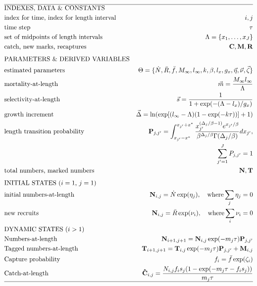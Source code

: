 \begin{table}
  \centering
\caption{Data, parameters, and analytical procedures for the length-based mark-recapture model.}\label{table:LSMRmodel} 
\tableEq
	\begin{small}
    \begin{align}
        \hline
		&\mbox{INDEXES, DATA \& CONSTANTS} \nonumber\\
		&\mbox{index for time, index for length interval} 
		&i,j \label{eq:T1.1}\\ 
		&\mbox{time step}  & \tau\\
		&\mbox{set of midpoints of length intervals}
		&\Lambda = \{x_1, \ldots,x_J\}\\
		&\mbox{catch, new marks, recaptures} 
		&\mathbf{C}, \mathbf{M}, \mathbf{R}\\[1ex]
		&\mbox{PARAMETERS \& DERIVED VARIABLES} \nonumber\\
		&\mbox{estimated parameters} 
		&\Theta=\{\dot{N},\bar{R},\bar{f},M_\infty,l_\infty,k,\beta,l_x,g_x,
			\vec{\eta},\vec{\nu},\vec{\zeta} \}\\
		&\mbox{mortality-at-length} 
		& \vec{m} = \frac{M_\infty l_\infty}{\Lambda}
		\label{eq:T1.6}\\
		&\mbox{selectivity-at-length} 
		& \vec{s} = \frac{1}{1+\exp(-(\Lambda-l_x)/g_x)}
		\label{eq:T1.7}\\
		&\mbox{growth increment} 
		& \vec{\Delta} = \ln( \exp[(l_\infty-\Lambda)(1-\exp(-k \tau))] +1)
		\label{eq:T1.8}\\
		&\mbox{length transition probability}
		& \mathbf{P}_{j,j'} =\int_{x_{j'}-x^*}^{x_{j'}+x^*} \frac{x_{j'}^{(\Delta_{j}/\beta-1)}
		e^{x_{j'}/\beta}}{\beta^{\Delta_{j}/\beta} \Gamma(\Delta_{j}/\beta)}dx_{j'}, \nonumber\\
		& &\quad \sum_{j'=1}^J P_{j,j'}= 1 
		\label{eq:T1.9}\\
		&\mbox{total numbers, marked numbers} 
		& \mathbf{N}, \mathbf{T}\\[1ex]
		&\mbox{INITIAL STATES ($i=1$, $j=1$)}  \nonumber\\
		&\mbox{initial numbers-at-length}
		&\mathbf{N}_{i,j} = \dot{N}\exp(\eta_j), \quad \mbox{where} \sum_j \eta_j=0
		\label{eq:T1.11}\\
		&\mbox{new recruits}
		&\mathbf{N}_{i,j} = \bar{R}\exp(\nu_i), \quad \mbox{where} \sum_i \nu_i=0
		\label{eq:T1.12}\\
		&\mbox{DYNAMIC STATES ($i>1$)} \nonumber\\
		&\mbox{Numbers-at-length}
		&\mathbf{N}_{i+1,j+1} = \mathbf{N}_{i,j} \exp(-m_j \tau) \mathbf{P}_{j,j'}\\
		&\mbox{Tagged numbers-at-length}
		&\mathbf{T}_{i+1,j+1} = \mathbf{T}_{i,j} \exp(-m_j \tau) \mathbf{P}_{j,j'} + \mathbf{M}_{i,j}\\
		&\mbox{Capture probability} 
		&f_i = \bar{f} \exp(\zeta_i)\\
		&\mbox{Catch-at-length}
		&\mathbf{\hat{C}}_{i,j} = \frac{N_{i,j}f_i s_j(1-\exp(-m_j\tau-f_is_j))}{m_j\tau}\\
		\hline \nonumber
    \end{align}
\end{small}
    \normalEq
\end{table}

